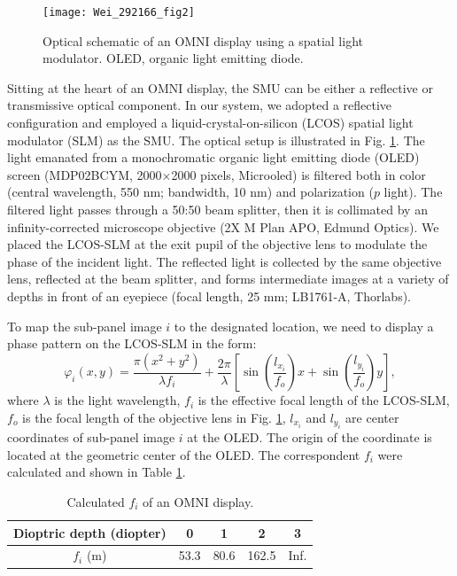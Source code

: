 \documentclass[9pt,twocolumn,twoside]{osajnl}
\begin{document}
\begin{figure}[htbp]
	\centering
	\texttt{[image: Wei\_292166\_fig2]}
	\caption{Optical schematic of an OMNI display using a spatial light modulator. OLED, organic light emitting diode.}
	\label{fig:2}
\end{figure}
Sitting at the heart of an OMNI display, the SMU can be either a reflective or transmissive optical component. In our system, we adopted a reflective configuration and employed a liquid-crystal-on-silicon (LCOS) spatial light modulator (SLM) as the SMU. The optical setup is illustrated in Fig. \ref{fig:2}. The light emanated from a monochromatic organic light emitting diode (OLED) screen (MDP02BCYM, 2000$\times$2000 pixels, Microoled) is filtered both in color (central wavelength, 550 nm; bandwidth, 10 nm) and polarization ($p$ light). The filtered light passes through a 50:50 beam splitter, then it is collimated by an infinity-corrected microscope objective (2X M Plan APO, Edmund Optics). We placed the LCOS-SLM at the exit pupil of the objective lens to modulate the phase of the incident light. The reflected light is collected by the same objective lens, reflected at the beam splitter, and forms intermediate images at a variety of depths in front of an eyepiece (focal length, 25 mm; LB1761-A, Thorlabs).\par
To map the sub-panel image $i$ to the designated location, we need to display a phase pattern on the LCOS-SLM in the form:
\begin{equation}
\varphi_{i}(x,y)=\frac{\pi (x^{2}+y^{2})}{\lambda f_{i}} + \frac{2 \pi}{\lambda}\left[\sin\left(\frac{l_{x_i}}{f_{o}}\right)x +\sin\left(\frac{l_{y_i}}{f_{o}}\right)y\right],
\label{eq:1}
\end{equation}
where $\lambda$ is the light wavelength, $f_i$ is the effective focal length of the LCOS-SLM, $f_o$ is the focal length of the objective lens in Fig. \ref{fig:2}, $l_{x_i}$ and $l_{y_i}$ are center coordinates of sub-panel image $i$ at the OLED. The origin of the coordinate is located at the geometric center of the OLED. The correspondent $f_i$ were calculated and shown in Table \ref{table:1}.\par
\begin{table}[htbp]
	\centering
	\caption{Calculated $f_i$ of an OMNI display.}
	\label{table:1}
	\begin{tabular}{ccccc}
		\hline
		Dioptric depth (diopter)&0&1&2&3\\
		\hline
		$f_i$ (m)&53.3&80.6&162.5&Inf.\\
		\hline
	\end{tabular}
\end{table}
\end{document}
